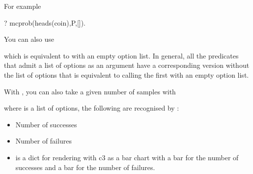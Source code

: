 \documentclass[letterpaper,10pt,english]{sphinxmanual}
\begin{document}
For example

\begin{sphinxVerbatim}[commandchars=\\\{\}]
?\PYGZhy{} mc\PYGZus{}prob(heads(coin),P,[]).
\end{sphinxVerbatim}

You can also use

\begin{sphinxVerbatim}[commandchars=\\\{\}]
  
\end{sphinxVerbatim}

which is equivalent to  with an empty option list.
In general, all the predicates that admit a list of options as an argument have a corresponding version without the list of options that is equivalent to calling the first with an empty option list.

With , you can also take a given number of samples with

\begin{sphinxVerbatim}[commandchars=\\\{\}]
   
\end{sphinxVerbatim}

where  is a list of options, the following are recognised by :
\begin{itemize}
\item {} 
 Number of successes

\item {} 
 Number of failures

\item {} 
  is a dict for rendering with c3 as a bar chart with a bar for the number of successes and a bar for the number of failures.

\end{itemize}
\end{document}
